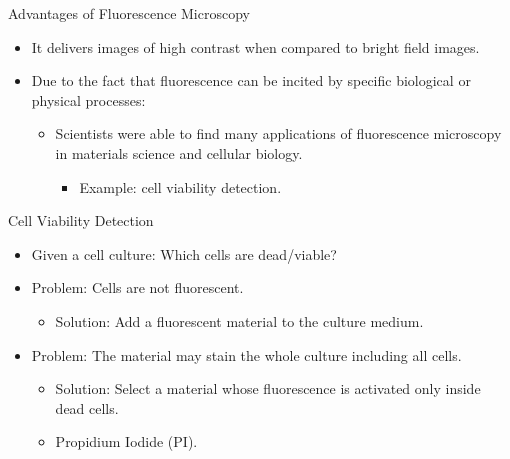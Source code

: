 \begin{frame}{Advantages of Fluorescence Microscopy}
	\begin{itemize}
		\item<1-> It delivers images of high contrast when compared to bright field images.
		\item<2-> Due to the fact that fluorescence can be incited by specific biological or physical processes:
		      \begin{itemize} \item<3-> Scientists were able to find many applications of fluorescence microscopy in materials science and cellular biology.
			            \begin{itemize}\item<4-> Example: cell viability detection.\end{itemize}
		      \end{itemize}
	\end{itemize}
\end{frame}
\begin{frame}{Cell Viability Detection}
	\begin{itemize}
		\item<1-> Given a cell culture: Which cells are dead/viable?
		\item<2-> Problem: Cells are not fluorescent.
		      \begin{itemize} \item<3-> Solution: Add a fluorescent material to the culture medium.\end{itemize}
		\item<4-> Problem: The material may stain the whole culture including all cells.
		      \begin{itemize} \item<5-> Solution: Select a material whose fluorescence is activated only inside dead cells.
			      \item<6-> Propidium Iodide (PI).
		      \end{itemize}
	\end{itemize}
\end{frame}
